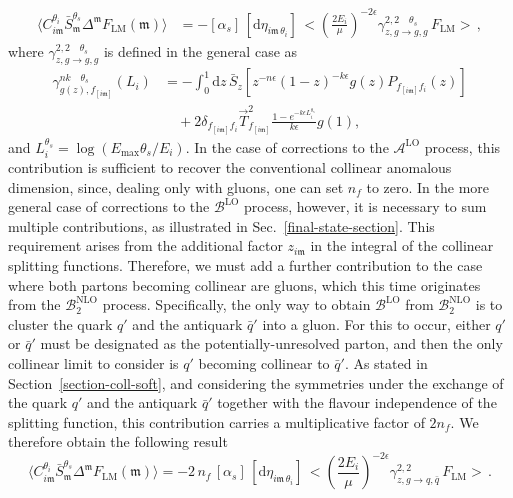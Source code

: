 \documentclass[a4paper, 12pt]{book}
\newcommand{\um}{\mathfrak{m}}
\begin{document}
\begin{equation}
  \begin{split}
  \langle C_{i\mathfrak{m}}^{\theta_i} \bar{S}_{\mathfrak{m}}^{\theta_s} \Delta^{\mathfrak{m}} F_{\mathrm{LM}}(\mathfrak{m})\rangle &= -[\alpha_s] \,[\mathrm{d}\eta_{i\um \, \theta_i}] \, \bigl< \left(\frac{2E_i}{\mu}\right)^{-2\epsilon} \gamma^{2,2 \quad \theta_s}_{z,g \to g, g} \, F_{\mathrm{LM}} \bigr> \, , 
  \label{coll-par-ggg}
  \end{split}
\end{equation}
where $\gamma^{2,2 \quad \theta_s}_{z,g \to g, g}$ is defined in the general case as
\begin{align}
  \gamma^{nk \quad \theta_s}_{g(z),f_{[i\um]}} (L_i) 
  &= - \int_0^1 \mathrm{d}z \, \bar{S}_z \left[z^{-n\epsilon}(1-z)^{-k\epsilon}g(z)P_{f_{[i\um]}f_i}(z)\right] \nonumber \\
  &\quad + 2 \delta_{f_{[i\um]}f_i} \vec{T}^2_{f_{[i\um]}} \frac{1-e^{-k \epsilon L_i^{\theta_s}}}{k\epsilon} g(1) ,
  \label{gen-an-dim-theta}
\end{align}
and $L_i^{\theta_s}=\log{\left(E_{\mathrm{max}}\theta_s/E_i\right)}$. In the case of corrections to the $\mathcal{A}^{\mathrm{LO}}$ process, this contribution is sufficient to recover the conventional collinear anomalous dimension, since, dealing only with gluons, one can set $n_f$ to zero. In the more general case of corrections to the $\mathcal{B}^{\mathrm{LO}}$ process, however, it is necessary to sum multiple contributions, as illustrated in Sec.~\ref{final-state-section}. This requirement arises from the additional factor $z_{i\um}$ in the integral of the collinear splitting functions. Therefore, we must add a further contribution to the case where both partons becoming collinear are gluons, which this time originates from the $\mathcal{B}_2^{\mathrm{NLO}}$ process. Specifically, the only way to obtain $\mathcal{B}^{\mathrm{LO}}$ from $\mathcal{B}_2^{\mathrm{NLO}}$ is to cluster the quark $q'$ and the antiquark $\bar{q}'$ into a gluon. For this to occur, either $q'$ or $\bar{q}'$ must be designated as the potentially-unresolved parton, and then the only collinear limit to consider is $q'$ becoming collinear to $\bar{q}'$. As stated in Section~\ref{section-coll-soft}, and considering the symmetries under the exchange of the quark $q'$ and the antiquark $\bar{q}'$ together with the flavour independence of the splitting function, this contribution carries a multiplicative factor of $2n_f$. We therefore obtain the following result
\begin{equation}
  \langle C_{i\mathfrak{m}}^{\theta_i} \bar{S}_{\mathfrak{m}}^{\theta_s} \Delta^{\mathfrak{m}} F_{\mathrm{LM}}(\mathfrak{m})\rangle = -2 \, n_f \, [\alpha_s] \,[\mathrm{d}\eta_{i\um \, \theta_i}] \, \bigl< \left(\frac{2E_i}{\mu}\right)^{-2\epsilon} \gamma^{2,2}_{z,g \to q, \bar{q}} \, F_{\mathrm{LM}} \bigr> \, . 
  \label{coll-par-gqq}
\end{equation}
\end{document}
